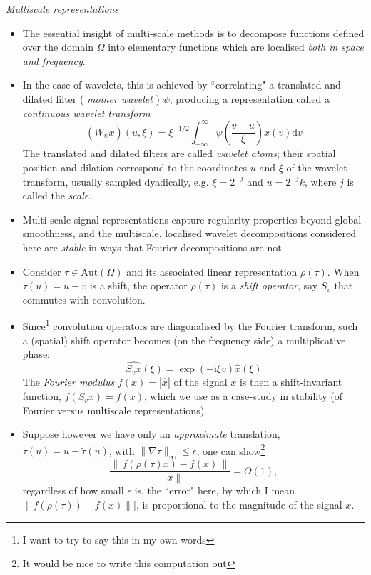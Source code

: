 \documentclass[12pt]{article}
\numberwithin{equation}{section}
\theoremstyle{definition}
\newcommand{		\n		}	{	\noindent					} %
\newcommand{		\1		}	{	\bm{1}					}%
\begin{document}
\n\hrulefill 
\emph{ Multiscale representations }
\hrulefill

\begin{itemize}
\item The essential insight of multi-scale methods is to decompose functions defined over the domain $\Omega$ into elementary functions which are localised \emph{both in space and frequency}. 

\item In the case of wavelets, this is achieved by ``correlating" a translated and dilated filter ( \emph{mother wavelet} ) $\psi$, producing a representation called a \emph{continuous wavelet transform}
    $$
    (W_\psi x)(u, \xi) = \xi^{-1/2} \int_{-\infty}^\infty \psi \left( \frac{v-u }{\xi } \right) x(v) \textrm{d} v
    $$ 
    The translated and dilated filters are called \emph{wavelet atoms}; their spatial position and dilation correspond to the coordinates $u$ and $\xi$ of the wavelet transform, usually sampled dyadically, e.g. $\xi = 2^{-j}$ and $u = {2^{-j} k }$, where $j$ is called the \emph{scale}. 
    
\item Multi-scale signal representations capture regularity properties beyond global smoothness, and the multiscale, localised wavelet decompositions considered here are \emph{stable} in ways that Fourier decompositions are not.

\item Consider $\tau \in \textrm{Aut}(\Omega)$ and its associated linear representation $\rho(\tau)$. When $\tau(u) = u -v$ is a shift, the operator $\rho(\tau)$ is a \emph{shift operator}, say $S_v$ that commutes with convolution. 

\item Since\footnote{I want to try to say this in my own words} convolution operators are diagonalised by the Fourier transform, such a (spatial) shift operator becomes (on the frequency side) a multiplicative phase:
    $$
    \widehat{ S_v x } (\xi) = \exp ( -  \textrm{i} \xi v ) \hat{x} (\xi)
    $$
    The \emph{Fourier modulus} $f(x) = | \hat{x} |$ of the signal $x$ is then a shift-invariant function, $f(S_v x) = f(x)$, which we use as a case-study in stability (of Fourier versus multiscale representations).
    
\item Suppose however we have only an \emph{approximate} translation, $\tau(u) = u - \tilde{\tau}(u)$, with $ \| \nabla \tau \|_\infty \leq \epsilon$, one can show\footnote{It would be nice to write this computation out}
    $$
    \frac{ \| \, f( \rho(\tau) x ) - f(x) \, \| }{ \| x \| } = O(1) ,
    $$
    regardless of how small $\epsilon$ is, the ``error" here, by which I mean $\| f( \rho(\tau)  ) - f(x) \||$, is proportional to the magnitude of the signal $x$. 
    

\end{itemize}
\end{document}
